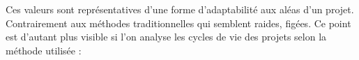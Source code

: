 \documentclass[12pt,a4paper]{article}
\begin{document}
Ces valeurs sont représentatives d’une forme d’adaptabilité aux aléas d’un projet. Contrairement aux méthodes traditionnelles qui semblent raides, figées. Ce point est d’autant plus visible si l’on analyse les cycles de vie des projets selon la méthode utilisée :


\end{document}
